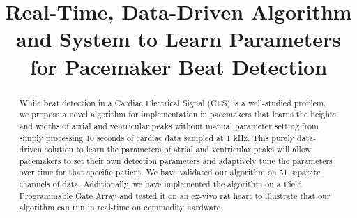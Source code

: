 \documentclass[conference]{IEEEtran}
\begin{document}
%
\title{Real-Time, Data-Driven Algorithm and System to Learn
Parameters for Pacemaker Beat Detection}


\author{
}







\maketitle

\begin{abstract}
While beat detection in a Cardiac Electrical 
Signal (CES) is a well-studied problem, we propose a novel
algorithm for implementation in pacemakers that learns the
heights and widths of atrial and ventricular peaks without manual parameter setting from simply
processing 10 seconds of cardiac data sampled at 1 kHz. 
This purely data-driven solution to learn the parameters of atrial
and ventricular peaks will allow pacemakers to set their own 
detection parameters and adaptively tune
the parameters over time for that specific patient.
We have validated our algorithm on 51 separate channels of
data. Additionally, we have implemented the algorithm on a
Field Programmable Gate Array and tested it on an ex-vivo rat
heart to illustrate that our algorithm can run in real-time on commodity hardware.
\end{abstract}
\end{document}
